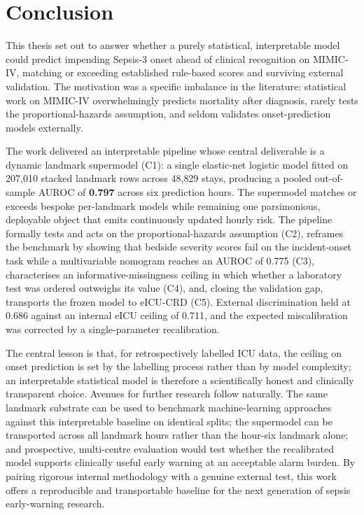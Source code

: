\chapter{Conclusion}
\label{ch:conclusion}

This thesis set out to answer whether a purely statistical, interpretable model
could predict impending Sepsis-3 onset ahead of clinical recognition on
MIMIC-IV, matching or exceeding established rule-based scores and surviving
external validation. The motivation was a specific imbalance in the literature:
statistical work on MIMIC-IV overwhelmingly predicts mortality after diagnosis,
rarely tests the proportional-hazards assumption, and seldom validates
onset-prediction models externally.

The work delivered an interpretable pipeline whose central deliverable is a
dynamic landmark supermodel (C1): a single elastic-net logistic model fitted on
207{,}010 stacked landmark rows across 48{,}829 stays, producing a pooled
out-of-sample AUROC of \textbf{0.797} across six prediction hours. The
supermodel matches or exceeds bespoke per-landmark models while remaining one
parsimonious, deployable object that emits continuously updated hourly risk.
The pipeline formally tests and acts on the proportional-hazards assumption
(C2), reframes the benchmark by showing that bedside severity scores fail on
the incident-onset task while a multivariable nomogram reaches an AUROC of
0.775 (C3), characterises an informative-missingness ceiling in which whether
a laboratory test was ordered outweighs its value (C4), and, closing the
validation gap, transports the frozen model to eICU-CRD (C5). External
discrimination held at 0.686 against an internal eICU ceiling of 0.711, and
the expected miscalibration was corrected by a single-parameter recalibration.

The central lesson is that, for retrospectively labelled ICU data, the ceiling
on onset prediction is set by the labelling process rather than by model
complexity; an interpretable statistical model is therefore a scientifically
honest and clinically transparent choice. Avenues for further research follow
naturally. The same landmark substrate can be used to benchmark machine-learning
approaches against this interpretable baseline on identical splits; the supermodel
can be transported across all landmark hours rather than the hour-six landmark
alone; and prospective, multi-centre evaluation would test whether the
recalibrated model supports clinically useful early warning at an acceptable
alarm burden. By pairing rigorous internal methodology with a genuine external
test, this work offers a reproducible and transportable baseline for the next
generation of sepsis early-warning research.
